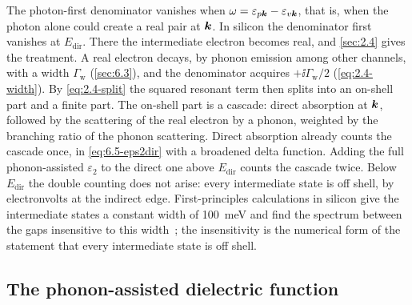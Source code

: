 The photon-first denominator vanishes when $\omega = \varepsilon_{p\bm{k}} - \varepsilon_{v\bm{k}}$, that is, when the photon alone could create a real pair at $\bm{k}$. In silicon the denominator first vanishes at $E_{\mathrm{dir}}$. There the intermediate electron becomes real, and \cref{sec:2.4} gives the treatment. A real electron decays, by phonon emission among other channels, with a width $\varGamma_{\mathrm{w}}$ (\cref{sec:6.3}), and the denominator acquires $+\ii\varGamma_{\mathrm{w}}/2$ (\cref{eq:2.4-width}). By \cref{eq:2.4-split} the squared resonant term then splits into an on-shell part and a finite part. The on-shell part is a cascade: direct absorption at $\bm{k}$, followed by the scattering of the real electron by a phonon, weighted by the branching ratio of the phonon scattering. Direct absorption already counts the cascade once, in \cref{eq:6.5-eps2dir} with a broadened delta function. Adding the full phonon-assisted $\varepsilon_2$ to the direct one above $E_{\mathrm{dir}}$ counts the cascade twice. Below $E_{\mathrm{dir}}$ the double counting does not arise: every intermediate state is off shell, by electronvolts at the indirect edge. First-principles calculations in silicon give the intermediate states a constant width of \SI{100}{meV} and find the spectrum between the gaps insensitive to this width~\cite{noffsinger2012phonon}; the insensitivity is the numerical form of the statement that every intermediate state is off shell.

\subsection{The phonon-assisted dielectric function}

